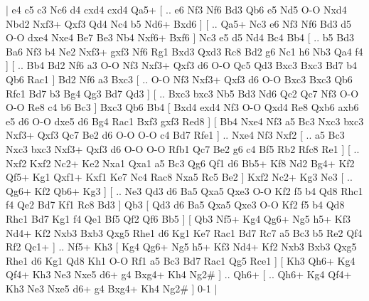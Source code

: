 \makegametitle 
|   e4   c5    c3   Nc6    d4   cxd4    cxd4   Qa5+ [ .. e6  Nf3 Nf6  Bd3 Qb6  e5 Nd5  O-O Nxd4  Nbd2 Nxf3+  Qxf3 Qd4  Nc4 b5  Nd6+ Bxd6   ]  [ .. Qa5+  Nc3 e6  Nf3 Nf6  Bd3 d5  O-O dxe4  Nxe4 Be7  Be3 Nb4  Nxf6+ Bxf6   ]  Nc3   e5    d5   Nd4    Bc4   Bb4 [ .. b5  Bd3 Ba6  Nf3 b4  Ne2 Nxf3+  gxf3 Nf6  Rg1 Bxd3  Qxd3 Rc8  Bd2 g6  Nc1 h6  Nb3 Qa4  f4   ]  [ .. Bb4  Bd2 Nf6  a3 O-O  Nf3 Nxf3+  Qxf3 d6  O-O Qc5  Qd3 Bxc3  Bxc3 Bd7  b4 Qb6  Rac1   ]  Bd2   Nf6    a3   Bxc3 [ .. O-O  Nf3 Nxf3+  Qxf3 d6  O-O Bxc3  Bxc3 Qb6  Rfc1 Bd7  b3 Bg4  Qg3 Bd7  Qd3   ]  [ .. Bxc3  bxc3 Nb5  Bd3 Nd6  Qc2 Qc7  Nf3 O-O  O-O Re8  c4 b6  Bc3   ]  Bxc3   Qb6    Bb4 [  Bxd4 exd4  Nf3 O-O  Qxd4 Re8  Qxb6 axb6  e5 d6  O-O dxe5  d6 Bg4  Rac1 Bxf3  gxf3 Red8   ]  [  Bb4 Nxe4  Nf3 a5  Bc3 Nxc3  bxc3 Nxf3+  Qxf3 Qc7  Be2 d6  O-O O-O  c4 Bd7  Rfe1   ] .. Nxe4    Nf3   Nxf2 [ .. a5  Bc3 Nxc3  bxc3 Nxf3+  Qxf3 d6  O-O O-O  Rfb1 Qc7  Be2 g6  c4 Bf5  Rb2 Rfc8  Re1   ]  [ .. Nxf2  Kxf2 Nc2+  Ke2 Nxa1  Qxa1 a5  Bc3 Qg6  Qf1 d6  Bb5+ Kf8  Nd2 Bg4+  Kf2 Qf5+  Kg1 Qxf1+  Kxf1 Ke7  Nc4 Rac8  Nxa5 Rc5  Be2   ]  Kxf2   Nc2+    Kg3   Ne3 [ .. Qg6+  Kf2 Qb6+  Kg3   ]  [ .. Ne3  Qd3 d6  Ba5 Qxa5  Qxe3 O-O  Kf2 f5  b4 Qd8  Rhc1 f4  Qe2 Bd7  Kf1 Rc8  Bd3   ]  Qb3 [  Qd3 d6  Ba5 Qxa5  Qxe3 O-O  Kf2 f5  b4 Qd8  Rhc1 Bd7  Kg1 f4  Qe1 Bf5  Qf2 Qf6  Bb5   ]  [  Qb3 Nf5+  Kg4 Qg6+  Ng5 h5+  Kf3 Nd4+  Kf2 Nxb3  Bxb3 Qxg5  Rhe1 d6  Kg1 Ke7  Rac1 Bd7  Rc7 a5  Bc3 b5  Re2 Qf4  Rf2 Qc1+   ] .. Nf5+    Kh3 [  Kg4 Qg6+  Ng5 h5+  Kf3 Nd4+  Kf2 Nxb3  Bxb3 Qxg5  Rhe1 d6  Kg1 Qd8  Kh1 O-O  Rf1 a5  Bc3 Bd7  Rac1 Qg5  Rce1   ]  [  Kh3 Qh6+  Kg4 Qf4+  Kh3 Ne3  Nxe5 d6+  g4 Bxg4+  Kh4 Ng2#   ] .. Qh6+    [ .. Qh6+  Kg4 Qf4+  Kh3 Ne3  Nxe5 d6+  g4 Bxg4+  Kh4 Ng2#   ] 0-1  |
